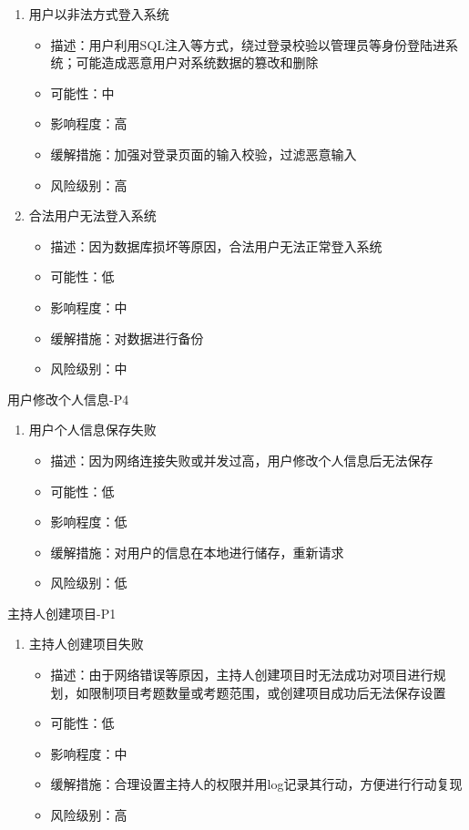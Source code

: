 \documentclass[hyperref, a4paper]{ctexart}
\providecommand{\tightlist}{%
  \setlength{\itemsep}{0pt}\setlength{\parskip}{0pt}}
\begin{document}
\begin{enumerate}
\def\labelenumi{\arabic{enumi}.}
\tightlist
\item
  用户以非法方式登入系统

  \begin{itemize}
  \tightlist
  \item
    描述：用户利用SQL注入等方式，绕过登录校验以管理员等身份登陆进系统；可能造成恶意用户对系统数据的篡改和删除
  \item
    可能性：中
  \item
    影响程度：高
  \item
    缓解措施：加强对登录页面的输入校验，过滤恶意输入
  \item
    风险级别：高
  \end{itemize}
\item
  合法用户无法登入系统

  \begin{itemize}
  \tightlist
  \item
    描述：因为数据库损坏等原因，合法用户无法正常登入系统
  \item
    可能性：低
  \item
    影响程度：中
  \item
    缓解措施：对数据进行备份
  \item
    风险级别：中
  \end{itemize}
\end{enumerate}

用户修改个人信息-P4

\begin{enumerate}
\def\labelenumi{\arabic{enumi}.}
\tightlist
\item
  用户个人信息保存失败

  \begin{itemize}
  \tightlist
  \item
    描述：因为网络连接失败或并发过高，用户修改个人信息后无法保存
  \item
    可能性：低
  \item
    影响程度：低
  \item
    缓解措施：对用户的信息在本地进行储存，重新请求
  \item
    风险级别：低
  \end{itemize}
\end{enumerate}

主持人创建项目-P1

\begin{enumerate}
\def\labelenumi{\arabic{enumi}.}
\tightlist
\item
  主持人创建项目失败

  \begin{itemize}
  \tightlist
  \item
    描述：由于网络错误等原因，主持人创建项目时无法成功对项目进行规划，如限制项目考题数量或考题范围，或创建项目成功后无法保存设置
  \item
    可能性：低
  \item
    影响程度：中
  \item
    缓解措施：合理设置主持人的权限并用log记录其行动，方便进行行动复现
  \item
    风险级别：高
  \end{itemize}
\end{enumerate}
\end{document}
